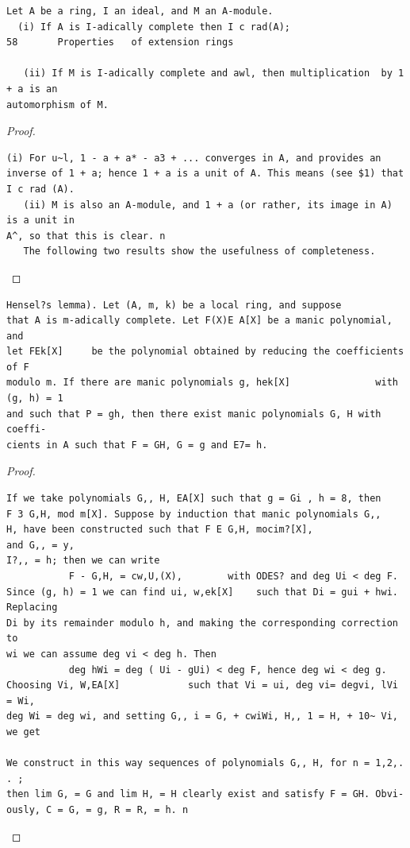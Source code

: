 \begin{theorem}\label{mcrt-auto-theorem-8-2}\uses{}
\begin{verbatim}
Let A be a ring, I an ideal, and M an A-module.
  (i) If A is I-adically complete then I c rad(A);
58       Properties   of extension rings

   (ii) If M is I-adically complete and awl, then multiplication  by 1 + a is an
automorphism of M.
\end{verbatim}
\end{theorem}
\begin{proof}
\begin{verbatim}
(i) For u~l, 1 - a + a* - a3 + ... converges in A, and provides an
inverse of 1 + a; hence 1 + a is a unit of A. This means (see $1) that
I c rad (A).
   (ii) M is also an A-module, and 1 + a (or rather, its image in A) is a unit in
A^, so that this is clear. n
   The following two results show the usefulness of completeness.
\end{verbatim}
\end{proof}


\begin{theorem}\label{mcrt-auto-theorem-8-3}\uses{}
\begin{verbatim}
Hensel?s lemma). Let (A, m, k) be a local ring, and suppose
that A is m-adically complete. Let F(X)E A[X] be a manic polynomial, and
let FEk[X]     be the polynomial obtained by reducing the coefficients of F
modulo m. If there are manic polynomials g, hek[X]               with (g, h) = 1
and such that P = gh, then there exist manic polynomials G, H with coeffi-
cients in A such that F = GH, G = g and E7= h.
\end{verbatim}
\end{theorem}
\begin{proof}
\begin{verbatim}
If we take polynomials G,, H, EA[X] such that g = Gi , h = 8, then
F 3 G,H, mod m[X]. Suppose by induction that manic polynomials G,,
H, have been constructed such that F E G,H, mocim?[X],              and G,, = y,
I?,, = h; then we can write
           F - G,H, = cw,U,(X),        with ODES? and deg Ui < deg F.
Since (g, h) = 1 we can find ui, w,ek[X]    such that Di = gui + hwi. Replacing
Di by its remainder modulo h, and making the corresponding correction to
wi we can assume deg vi < deg h. Then
           deg hWi = deg ( Ui - gUi) < deg F, hence deg wi < deg g.
Choosing Vi, W,EA[X]            such that Vi = ui, deg vi= degvi, lVi = Wi,
deg Wi = deg wi, and setting G,, i = G, + cwiWi, H,, 1 = H, + 10~ Vi,
we get

We construct in this way sequences of polynomials G,, H, for n = 1,2,. . ;
then lim G, = G and lim H, = H clearly exist and satisfy F = GH. Obvi-
ously, C = G, = g, R = R, = h. n
\end{verbatim}
\end{proof}


